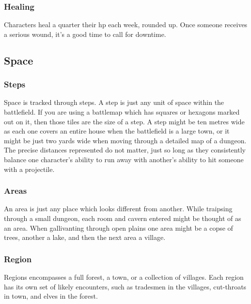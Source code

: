 \begin{multicols}{2}
\subsubsection{Healing}
\label{healing}
Characters heal a quarter their \gls{hp} each week, rounded up.
Once someone receives a serious wound, it's a good time to call for \gls{downtime}.

\subsection{Space}
\label{space}

\subsubsection{Steps}

Space is tracked through \glspl{step}.
A \gls{step} is just any unit of space within the battlefield.
If you are using a battlemap which has squares or hexagons marked out on it, then those tiles are the size of a step.
A step might be ten metres wide as each one covers an entire house when the battlefield is a large town, or it might be just two yards wide when moving through a detailed map of a dungeon.
The precise distances represented do not matter, just so long as they consistently balance one character's ability to run away with another's ability to hit someone with a projectile.

\subsubsection{Areas}

An \gls{area} is just any place which looks different from another.
While traipsing through a small dungeon, each room and cavern entered might be thought of as an \gls{area}.
When gallivanting through open plains one \gls{area} might be a copse of trees, another a lake, and then the next area a village.

\subsubsection{Region}

Regions encompasses a full forest, a town, or a collection of villages.
Each region has its own set of likely encounters, such as tradesmen in the villages, cut-throats in town, and elves in the forest.

\end{multicols}

